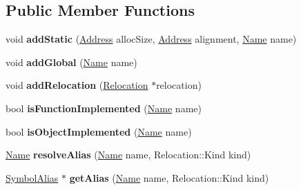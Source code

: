 \subsection*{Public Member Functions}
\begin{DoxyCompactItemize}
\item 
\mbox{\label{classwasm_1_1_linker_object_abe60edb80d182995cf4f96ca0683fb06}} 
void {\bfseries add\+Static} (\mbox{\hyperlink{structwasm_1_1_address}{Address}} alloc\+Size, \mbox{\hyperlink{structwasm_1_1_address}{Address}} alignment, \mbox{\hyperlink{structwasm_1_1_name}{Name}} name)
\item 
\mbox{\label{classwasm_1_1_linker_object_af07d6e825d0a2c798a5a1f64863360c2}} 
void {\bfseries add\+Global} (\mbox{\hyperlink{structwasm_1_1_name}{Name}} name)
\item 
\mbox{\label{classwasm_1_1_linker_object_a0e0576c65a281b2f642cab4b2e1c13f6}} 
void {\bfseries add\+Relocation} (\mbox{\hyperlink{structwasm_1_1_linker_object_1_1_relocation}{Relocation}} $\ast$relocation)
\item 
\mbox{\label{classwasm_1_1_linker_object_abe09eafd98adcdf92ab2d746d2a2cff0}} 
bool {\bfseries is\+Function\+Implemented} (\mbox{\hyperlink{structwasm_1_1_name}{Name}} name)
\item 
\mbox{\label{classwasm_1_1_linker_object_adacb6ff55feb268227a4476e3cf62f59}} 
bool {\bfseries is\+Object\+Implemented} (\mbox{\hyperlink{structwasm_1_1_name}{Name}} name)
\item 
\mbox{\label{classwasm_1_1_linker_object_aa50f84baafcde305843cd8019d5cba68}} 
\mbox{\hyperlink{structwasm_1_1_name}{Name}} {\bfseries resolve\+Alias} (\mbox{\hyperlink{structwasm_1_1_name}{Name}} name, Relocation\+::\+Kind kind)
\item 
\mbox{\label{classwasm_1_1_linker_object_a84557916812293e89b5f8e3e06b4ec38}} 
\mbox{\hyperlink{structwasm_1_1_linker_object_1_1_symbol_alias}{Symbol\+Alias}} $\ast$ {\bfseries get\+Alias} (\mbox{\hyperlink{structwasm_1_1_name}{Name}} name, Relocation\+::\+Kind kind)

\end{DoxyCompactItemize}
